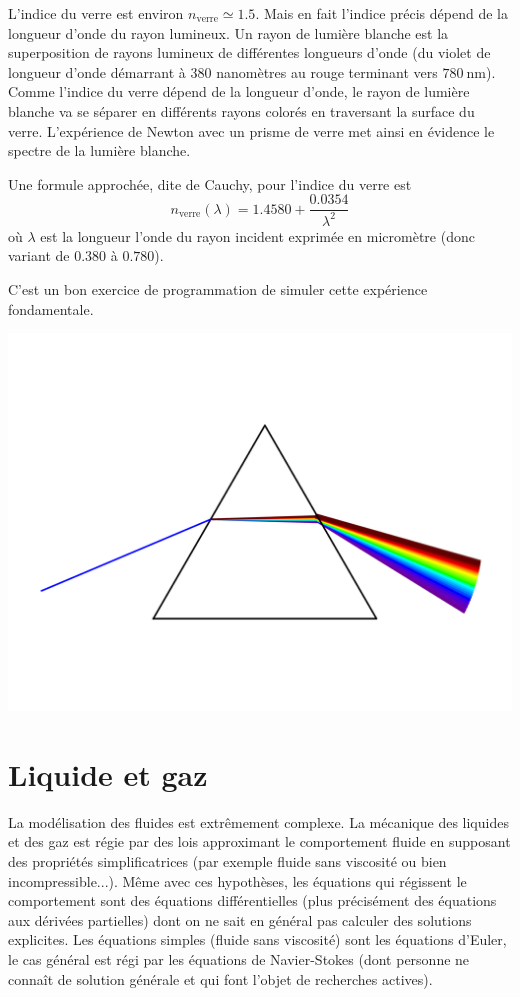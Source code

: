 \documentclass[11pt,class=report,crop=false]{standalone}
\begin{document}
L'indice du verre est environ $n_{\text{verre}} \simeq 1.5$. Mais en fait l'indice précis dépend de la longueur d'onde du rayon lumineux. Un rayon de lumière blanche est la superposition de rayons lumineux de différentes longueurs d'onde (du violet de longueur d'onde démarrant à $380$ nanomètres au rouge terminant vers $\SI{780}{\nano\meter}$).
Comme l'indice du verre dépend de la longueur d'onde, le rayon de lumière blanche va se séparer en différents rayons colorés en traversant la surface du verre. L'expérience de Newton avec un prisme de verre met ainsi en évidence le spectre de la lumière blanche.

Une formule approchée, dite de Cauchy, pour l'indice du verre est
$$n_{\text{verre}}(\lambda) = 1.4580 + \frac{0.0354}{\lambda^2}$$
où $\lambda$ est la longueur l'onde du rayon incident exprimée en micromètre (donc variant de $0.380$ à $0.780$).

C'est un bon exercice de programmation de simuler cette expérience fondamentale.


\begin{center}
	\includegraphics[scale=\myscale,scale=1,trim={0 2cm 0 3cm},clip]{figures/prisme}			
\end{center}




\section{Liquide et gaz}

La modélisation des fluides est extrêmement complexe.
La mécanique des liquides et des gaz est régie par des lois approximant le comportement  fluide en supposant des propriétés simplificatrices (par exemple fluide sans viscosité ou bien incompressible...). Même avec ces hypothèses, les équations qui régissent le comportement sont des équations différentielles (plus précisément des équations aux dérivées partielles) dont on ne sait en général pas calculer des solutions explicites.
Les équations simples (fluide sans viscosité) sont les équations d'Euler, le cas général est régi par les équations de Navier-Stokes (dont personne ne connaît de solution générale et qui font l'objet de recherches actives).
\end{document}
